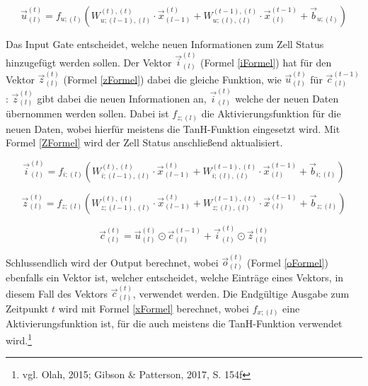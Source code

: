 \documentclass[a4paper,12pt,ngerman,oneside]{scrreprt}	%
\begin{document}
			\begin{equation}\label{uFormel}
			\vec{u}_{(l)}^{(t)} = f_{u;(l)} \left( W_{u; (l-1),(l)}^{(t),(t)} \cdot \vec{x}_{(l-1)}^{(t)} + W_{u; (l),(l)}^{(t-1),(t)} \cdot \vec{x}_{(l)}^{(t-1)} + \vec{b}_{u; (l)} \right)
			\end{equation}
			
			Das Input Gate entscheidet, welche neuen Informationen zum Zell Status hinzugefügt werden sollen. Der Vektor $\vec{i}_{(l)}^{(t)}$ (Formel \ref{iFormel}) hat für den Vektor $\vec{z}_{(l)}^{(t)}$ (Formel \ref{zFormel}) dabei die gleiche Funktion, wie $\vec{u}_{(l)}^{(t)}$ für $\vec{c}_{(l)}^{(t-1)}$: $\vec{z}_{(l)}^{(t)}$ gibt dabei die neuen Informationen an, $\vec{i}_{(l)}^{(t)}$ welche der neuen Daten übernommen werden sollen. Dabei ist $f_{z;(l)}$ die Aktivierungsfunktion für die neuen Daten, wobei hierfür meistens die TanH-Funktion eingesetzt wird. Mit Formel \ref{ZFormel} wird der Zell Status anschließend aktualisiert.
			
			\begin{equation}\label{iFormel}
				\vec{i}_{(l)}^{(t)} = f_{i;(l)} \left( W_{i; (l-1),(l)}^{(t),(t)} \cdot \vec{x}_{(l-1)}^{(t)} + W_{i; (l),(l)}^{(t-1),(t)} \cdot \vec{x}_{(l)}^{(t-1)} + \vec{b}_{i; (l)} \right)
			\end{equation}
			
			\begin{equation}\label{zFormel}
				\vec{z}_{(l)}^{(t)} = f_{z; (l)} \left( W_{z; (l-1),(l)}^{(t),(t)} \cdot \vec{x}_{(l-1)}^{(t)} + W_{z; (l),(l)}^{(t-1),(t)} \cdot \vec{x}_{(l)}^{(t-1)} + \vec{b}_{z; (l)} \right)
			\end{equation}
			
			\begin{equation}\label{ZFormel}
				\vec{c}_{(l)}^{(t)} = \vec{u}_{(l)}^{(t)} \odot \vec{c}_{(l)}^{(t-1)} + \vec{i}_{(l)}^{(t)} \odot \vec{z}_{(l)}^{(t)}
			\end{equation}
			
			Schlussendlich wird der Output berechnet, wobei $\vec{o}_{(l)}^{(t)}$ (Formel \ref{oFormel}) ebenfalls ein Vektor ist, welcher entscheidet, welche Einträge eines Vektors, in diesem Fall des Vektors $\vec{c}_{(l)}^{(t)}$, verwendet werden. Die Endgültige Ausgabe zum Zeitpunkt $t$ wird mit Formel \ref{xFormel} berechnet, wobei $f_{x;(l)}$ eine Aktivierungsfunktion ist, für die auch meistens die TanH-Funktion verwendet wird.\footnote{vgl. Olah, 2015; Gibson \& Patterson, 2017, S. 154f} 
			
\end{document}
